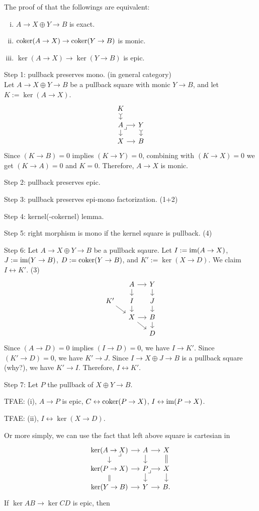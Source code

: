 \documentclass{../../large}
\begin{document}
\begin{pf}
The proof of that the followings are equivalent:
\begin{enumerate}[(i)]
\item $A\to X\oplus Y\to B$ is exact.
\item $\operatorname{coker}(A\to X)\to\operatorname{coker}(Y\to B)$ is monic.
\item $\ker(A\to X)\to\ker(Y\to B)$ is epic.
\end{enumerate}

Step 1: pullback preserves mono. (in general category)\\
Let $A\to X\oplus Y\to B$ be a pullback square with monic $Y\to B$, and let $K:=\ker(A\to X)$. 
\[\begin{tikzcd}[sep=small]
K \dar[>->] & \\
A \rar\dar \pullback & Y \dar[>->] \\
X \rar & B
\end{tikzcd}\]
Since $(K\to B)=0$ implies $(K\to Y)=0$, combining with $(K\to X)=0$ we get $(K\to A)=0$ and $K=0$.
Therefore, $A\to X$ is monic.

Step 2: pullback preserves epic.


Step 3: pullback preserves epi-mono factorization. (1+2)


Step 4: kernel(-cokernel) lemma.

Step 5: right morphism is mono if the kernel square is pullback. (4)

Step 6: Let $A\to X\oplus Y\to B$ be a pullback sqaure.
Let $I:=\operatorname{im}(A\to X)$, $J:=\operatorname{im}(Y\to B)$, $D:=\operatorname{coker}(Y\to B)$, and $K':=\ker(X\to D)$.
We claim $I\leftrightarrow K'$. (3)
\[\begin{tikzcd}[sep=small]
 &A\dar\rar&Y\dar \\
K'\ar{dr}&I\dar&J\dar \\
 &X\rar\ar{dr}&B\dar \\
 & &D
\end{tikzcd}\]
Since $(A\to D)=0$ implies $(I\to D)=0$, we have $I\to K'$.
Since $(K'\to D)=0$, we have $K'\to J$.
Since $I\to X\oplus J\to B$ is a pullback square (why?), we have $K'\to I$.
Therefore, $I\leftrightarrow K'$.


Step 7: Let $P$ the pullback of $X\oplus Y\to B$.

TFAE: (i), $A\to P$ is epic, $C\leftrightarrow\operatorname{coker}(P\to X)$, $I\leftrightarrow\operatorname{im}(P\to X)$.

TFAE: (ii), $I\leftrightarrow\ker(X\to D)$.



Or more simply, we can use the fact that left above square is cartesian in
\[\begin{tikzcd}[sep=small]
\ker(A\to X) \rar\dar\pullback & A \rar\dar & X \dar[equal]\\
\ker(P\to X) \rar\dar[equal] & P \rar\dar\pullback & X \dar\\
\ker(Y\to B) \rar & Y \rar & B.
\end{tikzcd}\]
If $\ker AB\to\ker CD$ is epic, then 
\end{pf}
\end{document}

